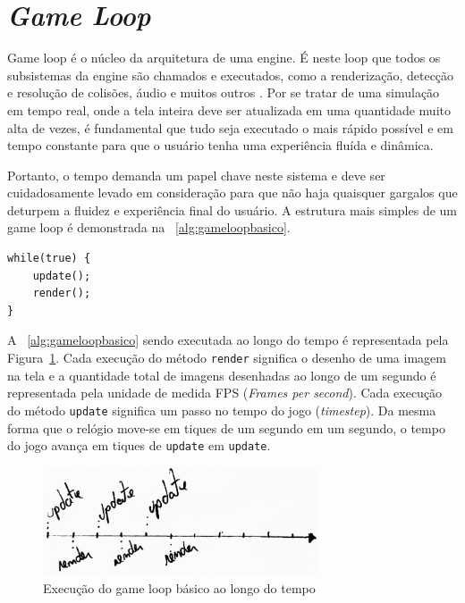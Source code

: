\documentclass[12pt, 
openright, 
oneside, 
a4paper,    
brazil]{facom-ufu-abntex2}
\begin{document}
\section{\textit{Game Loop}}
\label{sec:gameLoop}
Game loop é o núcleo da arquitetura de uma engine. É neste loop que todos os subsistemas da engine são chamados e  executados, como a renderização, detecção e resolução de colisões, áudio e muitos outros \cite{GameEngineArchitecture}. Por se tratar de uma simulação em tempo real, onde a tela inteira deve ser atualizada em uma quantidade muito alta de vezes, é fundamental que tudo seja executado o mais rápido possível e em tempo constante para que o usuário tenha uma experiência fluída e dinâmica.

Portanto, o tempo demanda um papel chave neste sistema e deve ser cuidadosamente levado em consideração para que não haja quaisquer gargalos que deturpem a fluidez e experiência final do usuário. A estrutura mais simples de um game loop é demonstrada na \lstlistingname~\ref{alg:gameloopbasico}.

\begin{lstlisting}[caption={Estrutura básica do Game Loop}, label={alg:gameloopbasico}]
while(true) {
	update();
	render();
}
\end{lstlisting}


A \lstlistingname~\ref{alg:gameloopbasico} sendo executada ao longo do tempo é representada pela Figura~\ref{fig:gameloopbasico}.
Cada execução do método \texttt{render} significa o desenho de uma imagem na tela e a quantidade total de imagens desenhadas ao longo de um segundo é representada pela unidade de medida FPS (\textit{Frames per second}). Cada execução do método \texttt{update} significa um passo no tempo do jogo (\textit{timestep}). Da mesma forma que o relógio move-se em tiques de um segundo em um segundo, o tempo do jogo avança em tiques de \texttt{update} em \texttt{update}.

\begin{figure}[H]
	\centering
	\includegraphics[width=22em]{imagens/ilu1_small.png}
	\caption{Execução do game loop básico ao longo do tempo\label{fig:gameloopbasico}}
\end{figure}
\end{document}
